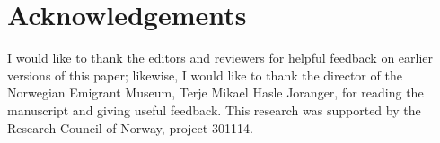 \documentclass[output=paper]{langscibook}
\begin{document}
\section*{Acknowledgements}

I would like to thank the editors and reviewers for helpful feedback on earlier versions of this paper; likewise, I would like to thank the director of the Norwegian Emigrant Museum, Terje Mikael Hasle Joranger, for reading the manuscript and giving useful feedback.  This research was supported by the Research Council of Norway, project 301114.

\printbibliography[heading=subbibliography,notkeyword=this]
\end{document}
